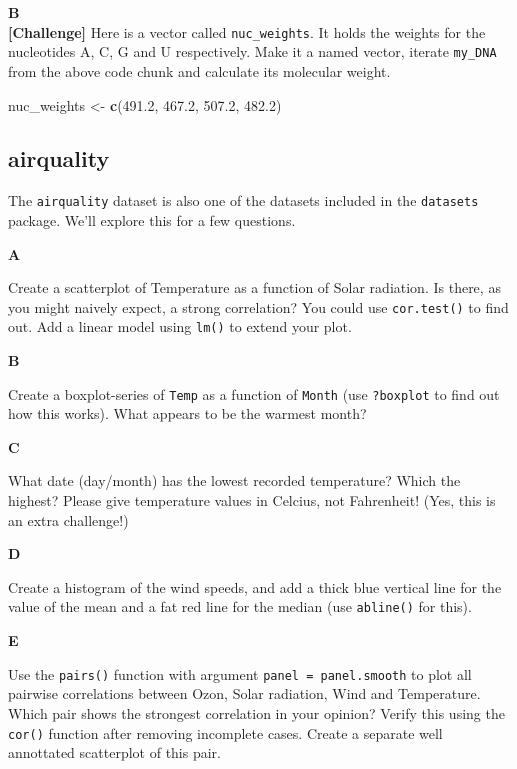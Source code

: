 \documentclass[]{book}
\newenvironment{Shaded}{\begin{snugshade}}{\end{snugshade}}
\newcommand{\FloatTok}[1]{\textcolor[rgb]{0.00,0.00,0.81}{#1}}
\newcommand{\KeywordTok}[1]{\textcolor[rgb]{0.13,0.29,0.53}{\textbf{#1}}}
\newcommand{\NormalTok}[1]{#1}
\newcommand{\StringTok}[1]{\textcolor[rgb]{0.31,0.60,0.02}{#1}}
\begin{document}
\textbf{B}\\
\textbf{{[}Challenge{]}} Here is a vector called \texttt{nuc\_weights}. It holds the weights for the nucleotides A, C, G and U respectively. Make it a named vector, iterate \texttt{my\_DNA} from the above code chunk and calculate its molecular weight.

\begin{Shaded}
\begin{Highlighting}[]
\NormalTok{nuc_weights <-}\StringTok{ }\KeywordTok{c}\NormalTok{(}\FloatTok{491.2}\NormalTok{, }\FloatTok{467.2}\NormalTok{, }\FloatTok{507.2}\NormalTok{, }\FloatTok{482.2}\NormalTok{)}
\end{Highlighting}
\end{Shaded}

\hypertarget{airquality}{%
\subsection{airquality}\label{airquality}}

The \texttt{airquality} dataset is also one of the datasets included in the \texttt{datasets} package. We'll explore this for a few questions.

\textbf{A}

Create a scatterplot of Temperature as a function of Solar radiation. Is there, as you might naively expect, a strong correlation? You could use \texttt{cor.test()} to find out. Add a linear model using \texttt{lm()} to extend your plot.

\textbf{B}

Create a boxplot-series of \texttt{Temp} as a function of \texttt{Month} (use \texttt{?boxplot} to find out how this works). What appears to be the warmest month?

\textbf{C}

What date (day/month) has the lowest recorded temperature? Which the highest? Please give temperature values in Celcius, not Fahrenheit! (Yes, this is an extra challenge!)

\textbf{D}

Create a histogram of the wind speeds, and add a thick blue vertical line for the value of the mean and a fat red line for the median (use \texttt{abline()} for this).

\textbf{E}

Use the \texttt{pairs()} function with argument \texttt{panel\ =\ panel.smooth} to plot all pairwise correlations between Ozon, Solar radiation, Wind and Temperature. Which pair shows the strongest correlation in your opinion? Verify this using the \texttt{cor()} function after removing incomplete cases. Create a separate well annottated scatterplot of this pair.
\end{document}
